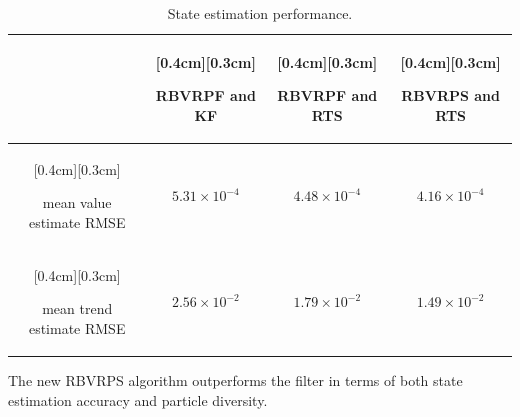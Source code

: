 \documentclass[journal]{IEEEtran}
\newenvironment{meta}[0]{\color{red} \em}{}
\begin{document}
\begin{table}%
\caption{State estimation performance.}
\label{tab:finance_state_performance}
\centering
\renewcommand{\arraystretch}{1.5}
\begin{tabular}{|c|c|c|c|}
\hline
 &\raisebox{0cm}[0.4cm][0.3cm]{\parbox[c]{1.5cm}{\centering RBVRPF and KF}} & \raisebox{0cm}[0.4cm][0.3cm]{\parbox[c]{1.5cm}{\centering RBVRPF and RTS}} & \raisebox{0cm}[0.4cm][0.3cm]{\parbox[c]{1.5cm}{\centering RBVRPS and RTS}} \\
\hline \hline
\raisebox{0cm}[0.4cm][0.3cm]{\parbox[c]{2cm}{\centering mean value estimate RMSE}}   & $5.31 \times 10^{-4}$ & $4.48 \times 10^{-4}$ & $4.16 \times 10^{-4}$ \\
\hline
\raisebox{0cm}[0.4cm][0.3cm]{\parbox[c]{2cm}{\centering mean trend estimate RMSE}}   & $2.56 \times 10^{-2}$ & $1.79 \times 10^{-2}$ & $1.49 \times 10^{-2}$ \\
\hline
\end{tabular}
\end{table}

The new RBVRPS algorithm outperforms the filter in terms of both state estimation accuracy and particle diversity.


\end{document}
